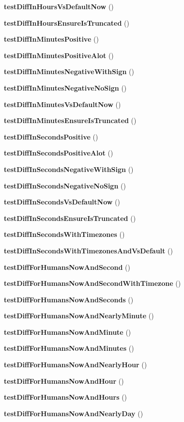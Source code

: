 \begin{DoxyCompactItemize}
{\bf test\+Diff\+In\+Hours\+Vs\+Default\+Now} ()
\item 
{\bf test\+Diff\+In\+Hours\+Ensure\+Is\+Truncated} ()
\item 
{\bf test\+Diff\+In\+Minutes\+Positive} ()
\item 
{\bf test\+Diff\+In\+Minutes\+Positive\+Alot} ()
\item 
{\bf test\+Diff\+In\+Minutes\+Negative\+With\+Sign} ()
\item 
{\bf test\+Diff\+In\+Minutes\+Negative\+No\+Sign} ()
\item 
{\bf test\+Diff\+In\+Minutes\+Vs\+Default\+Now} ()
\item 
{\bf test\+Diff\+In\+Minutes\+Ensure\+Is\+Truncated} ()
\item 
{\bf test\+Diff\+In\+Seconds\+Positive} ()
\item 
{\bf test\+Diff\+In\+Seconds\+Positive\+Alot} ()
\item 
{\bf test\+Diff\+In\+Seconds\+Negative\+With\+Sign} ()
\item 
{\bf test\+Diff\+In\+Seconds\+Negative\+No\+Sign} ()
\item 
{\bf test\+Diff\+In\+Seconds\+Vs\+Default\+Now} ()
\item 
{\bf test\+Diff\+In\+Seconds\+Ensure\+Is\+Truncated} ()
\item 
{\bf test\+Diff\+In\+Seconds\+With\+Timezones} ()
\item 
{\bf test\+Diff\+In\+Seconds\+With\+Timezones\+And\+Vs\+Default} ()
\item 
{\bf test\+Diff\+For\+Humans\+Now\+And\+Second} ()
\item 
{\bf test\+Diff\+For\+Humans\+Now\+And\+Second\+With\+Timezone} ()
\item 
{\bf test\+Diff\+For\+Humans\+Now\+And\+Seconds} ()
\item 
{\bf test\+Diff\+For\+Humans\+Now\+And\+Nearly\+Minute} ()
\item 
{\bf test\+Diff\+For\+Humans\+Now\+And\+Minute} ()
\item 
{\bf test\+Diff\+For\+Humans\+Now\+And\+Minutes} ()
\item 
{\bf test\+Diff\+For\+Humans\+Now\+And\+Nearly\+Hour} ()
\item 
{\bf test\+Diff\+For\+Humans\+Now\+And\+Hour} ()
\item 
{\bf test\+Diff\+For\+Humans\+Now\+And\+Hours} ()
\item 
{\bf test\+Diff\+For\+Humans\+Now\+And\+Nearly\+Day} ()
\item 

\end{DoxyCompactItemize}
